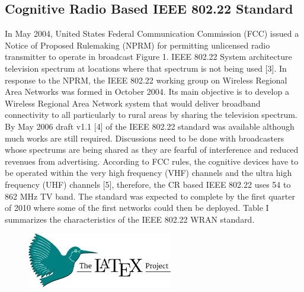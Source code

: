 \documentclass[conference]{IEEEtran}
\begin{document}
\begin{Summary - }
\vspace{1cm}


\section{Cognitive Radio Based IEEE 802.22 Standard}
In May 2004, United States Federal Communication
Commission (FCC) issued a Notice of Proposed Rulemaking
(NPRM) for permitting unlicensed radio transmitter to operate
in broadcast Figure 1. IEEE 802.22 System architecture
television spectrum at locations where that spectrum is not
being used [3]. In response to the NPRM, the IEEE 802.22
working group on Wireless Regional Area Networks was
formed in October 2004. Its main objective is to develop a
Wireless Regional Area Network system that would deliver
broadband connectivity to all particularly to rural areas by
sharing the television spectrum. By May 2006 draft v1.1 [4] of
the IEEE 802.22 standard was available although much works
are still required. Discussions need to be done with
broadcasters whose spectrums are being shared as they are
fearful of interference and reduced revenues from advertising.
According to FCC rules, the cognitive devices have to be
operated within the very high frequency (VHF) channels and
the ultra high frequency (UHF) channels [5], therefore, the CR
based IEEE 802.22 uses 54 to 862 MHz TV band. The standard
was expected to complete by the first quarter of 2010 where
some of the first networks could then be deployed. Table I
summarizes the characteristics of the IEEE 802.22 WRAN
standard.

\vspace{1cm}


\begin{figure}[h!] %
  \centering
  \includegraphics[width=2.5in]{im1.png}\\
\end{figure}

\vspace{1cm}



\end{Summary - }
\end{document}
